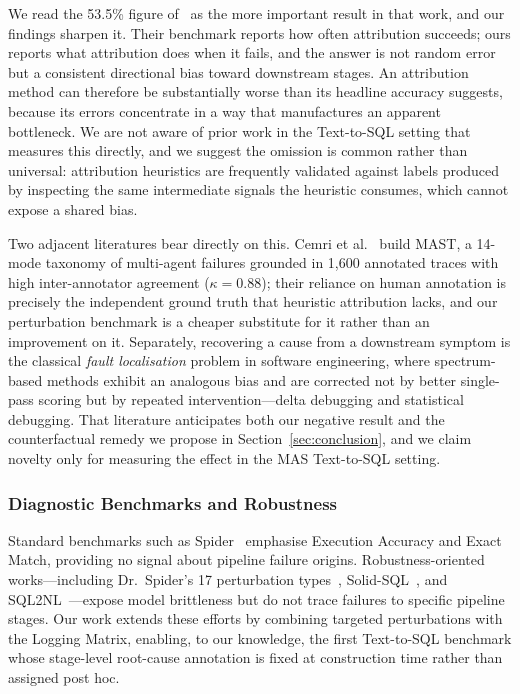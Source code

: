 \documentclass[conference]{IEEEtran}
\begin{document}
We read the 53.5\% figure of~\cite{zhang2025which} as the more important
result in that work, and our findings sharpen it. Their benchmark reports how
often attribution succeeds; ours reports what attribution does when it fails,
and the answer is not random error but a consistent directional bias toward
downstream stages. An attribution method can therefore be substantially worse
than its headline accuracy suggests, because its errors concentrate in a way
that manufactures an apparent bottleneck. We are not aware of prior work in
the Text-to-SQL setting that measures this directly, and we suggest the
omission is common rather than universal: attribution heuristics are frequently
validated against labels produced by inspecting the same intermediate signals
the heuristic consumes, which cannot expose a shared bias.

Two adjacent literatures bear directly on this. Cemri et
al.~\cite{cemri_mast_2025} build MAST, a 14-mode taxonomy of multi-agent
failures grounded in 1{,}600 annotated traces with high inter-annotator
agreement ($\kappa = 0.88$); their reliance on human annotation is precisely the
independent ground truth that heuristic attribution lacks, and our perturbation
benchmark is a cheaper substitute for it rather than an improvement on it.
Separately, recovering a cause from a downstream symptom is the classical
\emph{fault localisation} problem in software engineering, where
spectrum-based methods exhibit an analogous bias and are corrected not by
better single-pass scoring but by repeated intervention---delta debugging and
statistical debugging. That literature anticipates both our negative result and
the counterfactual remedy we propose in Section~\ref{sec:conclusion}, and we
claim novelty only for measuring the effect in the MAS Text-to-SQL setting.

\subsubsection{Diagnostic Benchmarks and Robustness}
Standard benchmarks such as Spider~\cite{yu_spider_2018} emphasise Execution Accuracy and Exact Match, providing no signal about pipeline failure origins. Robustness-oriented works---including Dr.~Spider's 17 perturbation types~\cite{chang_drspider_2023}, Solid-SQL~\cite{liu_solid-sql_2025}, and SQL2NL~\cite{safarzadeh_sql2nl_2025}---expose model brittleness but do not trace failures to specific pipeline stages. Our work extends these efforts by combining targeted perturbations with the Logging Matrix, enabling, to our knowledge, the first Text-to-SQL benchmark whose stage-level
root-cause annotation is fixed at construction time rather than assigned post
hoc.
\end{document}
